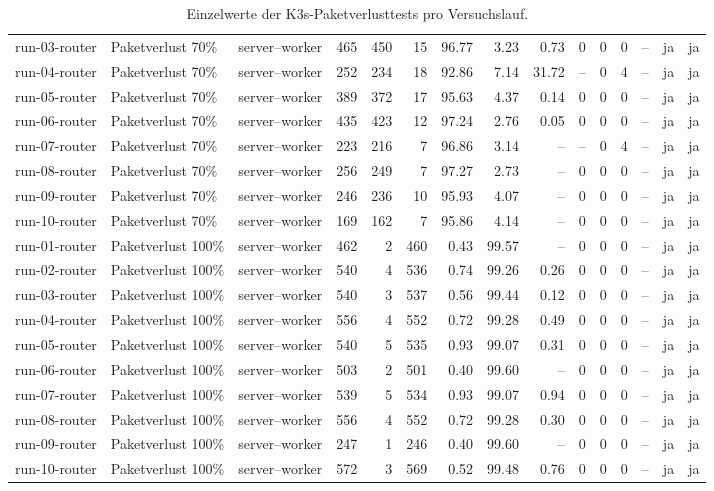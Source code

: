 \begin{table}
\begin{tabular}{l l p{3.2cm} r r r r r r r r r r r r}
run-03-router & Paketverlust 70\% & server--worker & 465 & 450 & 15 & 96.77 & 3.23 & 0.73 & 0 & 0 & 0 & -- & ja & ja \\
run-04-router & Paketverlust 70\% & server--worker & 252 & 234 & 18 & 92.86 & 7.14 & 31.72 & -- & 0 & 4 & -- & ja & ja \\
run-05-router & Paketverlust 70\% & server--worker & 389 & 372 & 17 & 95.63 & 4.37 & 0.14 & 0 & 0 & 0 & -- & ja & ja \\
run-06-router & Paketverlust 70\% & server--worker & 435 & 423 & 12 & 97.24 & 2.76 & 0.05 & 0 & 0 & 0 & -- & ja & ja \\
run-07-router & Paketverlust 70\% & server--worker & 223 & 216 & 7 & 96.86 & 3.14 & -- & -- & 0 & 4 & -- & ja & ja \\
run-08-router & Paketverlust 70\% & server--worker & 256 & 249 & 7 & 97.27 & 2.73 & -- & 0 & 0 & 0 & -- & ja & ja \\
run-09-router & Paketverlust 70\% & server--worker & 246 & 236 & 10 & 95.93 & 4.07 & -- & 0 & 0 & 0 & -- & ja & ja \\
run-10-router & Paketverlust 70\% & server--worker & 169 & 162 & 7 & 95.86 & 4.14 & -- & 0 & 0 & 0 & -- & ja & ja \\
run-01-router & Paketverlust 100\% & server--worker & 462 & 2 & 460 & 0.43 & 99.57 & -- & 0 & 0 & 0 & -- & ja & ja \\
run-02-router & Paketverlust 100\% & server--worker & 540 & 4 & 536 & 0.74 & 99.26 & 0.26 & 0 & 0 & 0 & -- & ja & ja \\
run-03-router & Paketverlust 100\% & server--worker & 540 & 3 & 537 & 0.56 & 99.44 & 0.12 & 0 & 0 & 0 & -- & ja & ja \\
run-04-router & Paketverlust 100\% & server--worker & 556 & 4 & 552 & 0.72 & 99.28 & 0.49 & 0 & 0 & 0 & -- & ja & ja \\
run-05-router & Paketverlust 100\% & server--worker & 540 & 5 & 535 & 0.93 & 99.07 & 0.31 & 0 & 0 & 0 & -- & ja & ja \\
run-06-router & Paketverlust 100\% & server--worker & 503 & 2 & 501 & 0.40 & 99.60 & -- & 0 & 0 & 0 & -- & ja & ja \\
run-07-router & Paketverlust 100\% & server--worker & 539 & 5 & 534 & 0.93 & 99.07 & 0.94 & 0 & 0 & 0 & -- & ja & ja \\
run-08-router & Paketverlust 100\% & server--worker & 556 & 4 & 552 & 0.72 & 99.28 & 0.30 & 0 & 0 & 0 & -- & ja & ja \\
run-09-router & Paketverlust 100\% & server--worker & 247 & 1 & 246 & 0.40 & 99.60 & -- & 0 & 0 & 0 & -- & ja & ja \\
run-10-router & Paketverlust 100\% & server--worker & 572 & 3 & 569 & 0.52 & 99.48 & 0.76 & 0 & 0 & 0 & -- & ja & ja \\
\bottomrule
\end{tabular}
\caption{Einzelwerte der K3s-Paketverlusttests pro Versuchslauf.}
\label{tab:appendix-k3s-packet-loss-runs}
\end{table}
